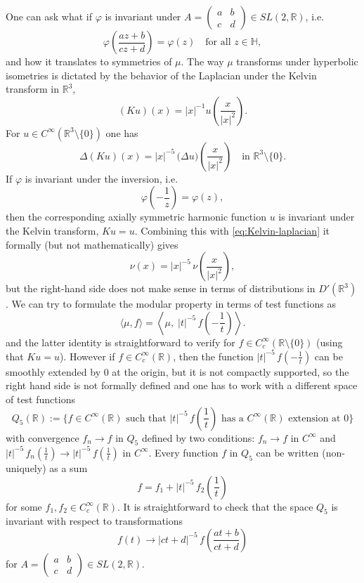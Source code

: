\documentclass{article}
\newcommand{\R}{\mathbb{R}}
\newcommand{\Hh}{\mathbb{H}}
\begin{document}
One can ask what if $\varphi$ is invariant under $A = \begin{pmatrix}a & b\\ c & d\end{pmatrix}\in SL(2,\R)$, i.e.
\[
\varphi\left(\frac{az+b}{cz+d}\right) = \varphi(z)
\quad\text{for all }z\in\Hh,
\]
and how it translates to symmetries of $\mu$.
The way $\mu$ transforms under hyperbolic isometries is dictated by the behavior of the Laplacian under the Kelvin transform in $\R^3$,
\[
(Ku)(x) = |x|^{-1}u\!\left(\frac{x}{|x|^2}\right).
\]
For $u\in C^\infty(\R^3\setminus\{0\})$ one has
\begin{equation}\label{eq:Kelvin-laplacian}
\Delta (Ku)(x)
= |x|^{-5}\,\bigl(\Delta u\bigr)\!\left(\frac{x}{|x|^2}\right)
\quad\text{in }\R^3\setminus\{0\}.
\end{equation}
If $\varphi$ is invariant under the inversion, i.e.
\[
\varphi\!\left(-\frac{1}{z}\right) = \varphi(z),
\]
then the corresponding axially symmetric harmonic function $u$ is invariant under the Kelvin transform, $Ku=u$. 
Combining this with \eqref{eq:Kelvin-laplacian} it formally (but not mathematically) gives
\[
\nu(x) = |x|^{-5}\,\nu\!\left(\frac{x}{|x|^2}\right),
\]
but the right-hand side does not  make sense in terms of distributions in $D'(\R^3)$. We can try to formulate the modular property in terms of test functions as
\begin{equation}\label{eq:weight5-inversion}
  \big\langle \mu,f\big\rangle
  = \left\langle \mu,\;|t|^{-5}\,
      f\!\left(-\frac{1}{t}\right)\right\rangle.
\end{equation}
and the latter identity is straightforward to verify for $f\in C_c^\infty(\mathbb{R}\setminus\{0\})$ (using that $Ku=u$).
However if $f\in C_c^\infty(\mathbb{R})$, then the function $|t|^{-5}\, f\!\left(-\frac{1}{t}\right)$ can be smoothly extended by $0$ at the origin, but it is not compactly supported, so the right hand side is not formally defined and one has to work with a different space of test functions
$$Q_5(\mathbb{R}):=
\{f\in C^\infty(\mathbb{R}) \text{ such that } |t|^{-5}\, f\!\left(\frac{1}{t}\right) \text{ has a } C^\infty( \mathbb R) \text{ extension at } 0\}$$
with convergence $f_n \to f$ in $Q_5$ defined by two conditions: $f_n \to f$ in $C^\infty$ and $|t|^{-5}\,f_n\!\left(\frac{1}{t}\right) \to |t|^{-5}\,f\!\left(\frac{1}{t}\right) $ in $C^\infty$.
Every function $f$ in $Q_5$ can be written (non-uniquely) as a sum $$f=f_1+|t|^{-5}\,f_2\!\left(\frac{1}{t}\right)$$ 
for some $f_1,f_2 \in C_c^\infty(\mathbb{R})$.
It is straightforward to check that the space $Q_5$ is invariant with respect to transformations $$f(t) \to |ct+d|^{-5}\,f\!\left(\frac{at+b}{ct+d}\right)$$
for $A = \begin{pmatrix}a & b\\ c & d\end{pmatrix}\in SL(2,\R)$.
\end{document}
